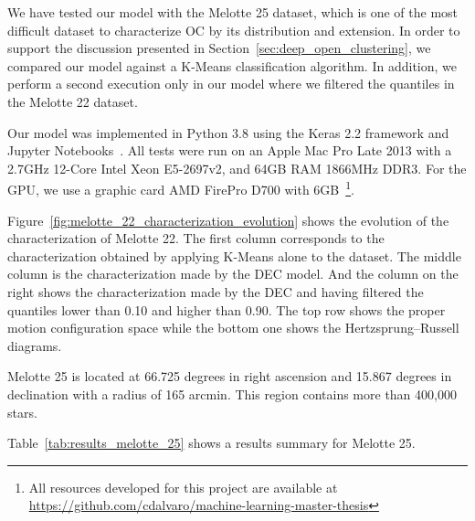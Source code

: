 \documentclass[11pt,a4paper,english,twocolumn]{article}
\begin{document}
We have tested our model with the Melotte 25 dataset, which is one of the most difficult dataset
to characterize OC by its distribution and extension. In order to support the discussion presented
in Section~\ref{sec:deep_open_clustering}, we compared our model against a K-Means classification
algorithm. In addition, we perform a second execution only in our model where we filtered the
quantiles in the Melotte 22 dataset.

Our model was implemented in Python 3.8 using the Keras 2.2 framework and Jupyter
Notebooks~\cite{Kluyver2016jupyter}. All tests were run on an Apple Mac Pro Late 2013 with a
2.7GHz 12-Core Intel Xeon E5-2697v2, and 64GB RAM 1866MHz DDR3. For the GPU, we use a graphic
card AMD FirePro D700 with 6GB~\footnote{All resources developed for this project are available
at \href{https://github.com/cdalvaro/machine-learning-master-thesis}
{https://github.com/cdalvaro/machine-learning-master-thesis}}.


Figure~\ref{fig:melotte_22_characterization_evolution} shows the evolution
of the characterization of Melotte 22. The first column corresponds to the
characterization obtained by applying K-Means alone to the dataset. The middle
column is the characterization made by the DEC model. And the column on the right
shows the characterization made by the DEC and having filtered the quantiles
lower than 0.10 and higher than 0.90. The top row shows the proper motion
configuration space while the bottom one shows the Hertzsprung–Russell diagrams.


Melotte 25 is located at 66.725 degrees in right ascension and 15.867
degrees in declination with a radius of 165 arcmin.
This region contains more than 400,000 stars.

Table~\ref{tab:results_melotte_25} shows a results summary for Melotte 25.
\end{document}
